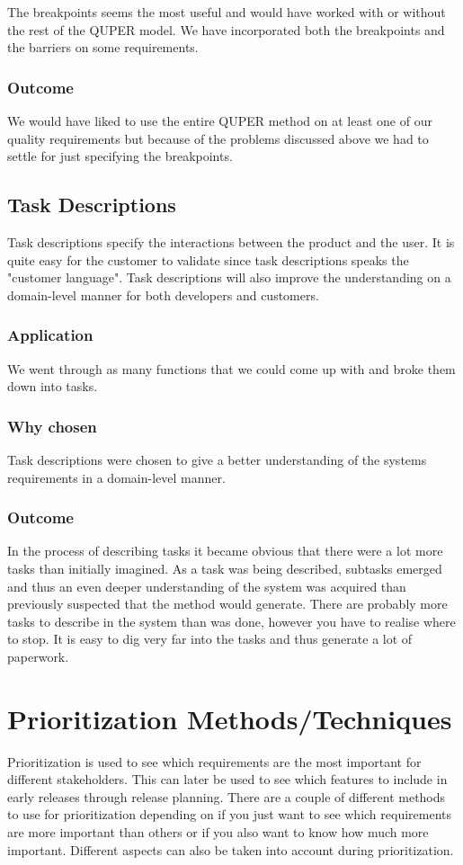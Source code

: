 \documentclass[a4paper]{article}
\begin{document}
			The breakpoints seems the most useful and would have worked with or without the rest of the QUPER model. We have incorporated both the breakpoints and the barriers on some requirements.

			\subsubsection{Outcome}
			We would have liked to use the entire QUPER method on at least one of our quality requirements but because of the problems discussed above we had to settle for just specifying the breakpoints.		
		
		
		\subsection{Task Descriptions}
			Task descriptions specify the interactions between the product and the user. It is quite easy for the customer to validate since task descriptions speaks the "customer language". Task descriptions will also improve the understanding on a domain-level manner for both developers and customers.

			\subsubsection{Application}
				We went through as many functions that we could come up with and broke them down into tasks. 
			\subsubsection{Why chosen}
				Task descriptions were chosen to give a better understanding of the systems requirements in a domain-level manner.
			\subsubsection{Outcome}	
				In the process of describing tasks it became obvious that there were a lot more tasks than initially imagined. As a task was being described, subtasks emerged and thus an even deeper understanding of the system was acquired than previously suspected that the method would generate. There are probably more tasks to describe in the system than was done, however you have to realise where to stop. It is easy to dig very far into the tasks and thus generate a lot of paperwork.

	\section{Prioritization Methods/Techniques}
	Prioritization is used to see which requirements are the most important for different stakeholders. This can later be used to see which features to include in early releases through release planning. There are a couple of different methods to use for prioritization depending on if you just want to see which requirements are more important than others or if you also want to know how much more important. Different aspects can also be taken into account during prioritization. 
	
\end{document}
